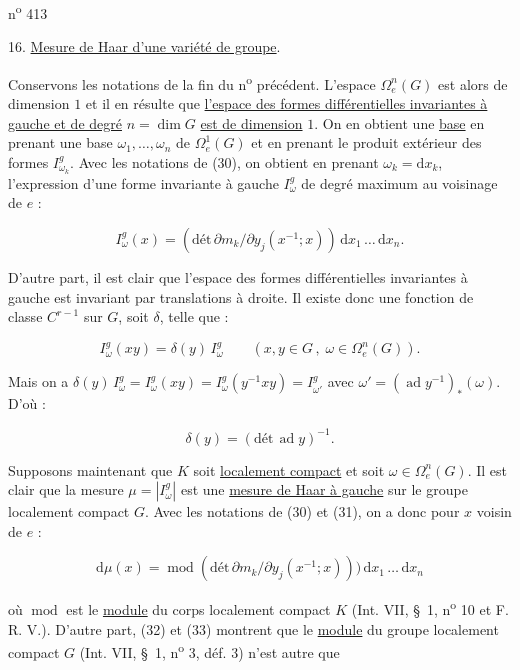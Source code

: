 \makeatletter
\tagsleft@true
\makeatother

 \hfill n\textsuperscript{o} 413

16. \uline{Mesure de Haar d'une variété de groupe}.

Conservons les notations de la fin du n\textsuperscript{o} précédent. L'espace $\Omega_e^n(G)$ est alors de dimension $1$ et il en résulte que \uline{l'espace des formes différentielles invariantes à gauche et de degré} $n=\dim G$ \uline{est de dimension} $1$. On en obtient une \uline{base} en prenant une base $\omega_1,\ldots,\omega_n$ de $\Omega_e^1(G)$ et en prenant le produit extérieur des formes $I^g_{\omega_k}$. Avec les notations de (30), on obtient en prenant $\omega_k=\mathrm{d}x_k$, l'expression d'une forme invariante à gauche $I^g_\omega$ de degré maximum au voisinage de $e$ :

\[
I^g_\omega(x)=(\text{dét}\,\partial m_k/\partial y_j(x^{-1};x))\,\mathrm{d}x_1\,\ldots\,\mathrm{d}x_n. \tag*{(31)}
\]

D'autre part, il est clair que l'espace des formes différentielles invariantes à gauche est invariant par translations à droite. Il existe donc une fonction de classe $C^{r-1}$ sur $G$, soit $\delta$, telle que :

\[
I^g_\omega(xy)=\delta(y)\,I^g_\omega\qquad (x,y\in G\,,\;\omega\in\Omega_e^n(G)). \tag*{(32)}
\]

Mais on a $\delta(y)\,I^g_\omega=I^g_\omega(xy)=I^g_\omega(y^{-1}xy)=I^g_{\omega'}$ avec $\omega'=(\operatorname{ad}y^{-1})_*(\omega)$. D'où :

\[
\delta(y)=(\text{dét}\,\operatorname{ad}y)^{-1}. \tag*{(33)}
\]

Supposons maintenant que $K$ soit \uline{localement compact} et soit $\omega\in\Omega_e^n(G)$. Il est clair que la mesure $\mu=|I^g_\omega|$ est une \uline{mesure de Haar à gauche} sur le groupe localement compact $G$. Avec les notations de (30) et (31), on a donc pour $x$ voisin de $e$ :

\[
\mathrm{d}\mu(x)=\operatorname{mod}(\text{dét}\,\partial m_k/\partial y_j(x^{-1};x)))\,\mathrm{d}x_1\,\ldots\,\mathrm{d}x_n \tag*{(34)}
\]

où $\operatorname{mod}$ est le \uline{module} du corps localement compact $K$ (Int. VII, \S\ 1, n\textsuperscript{o} 10 et F. R. V.). D'autre part, (32) et (33) montrent que le \uline{module} du groupe localement compact $G$ (Int. VII, \S\ 1, n\textsuperscript{o} 3, déf. 3) n'est autre que

